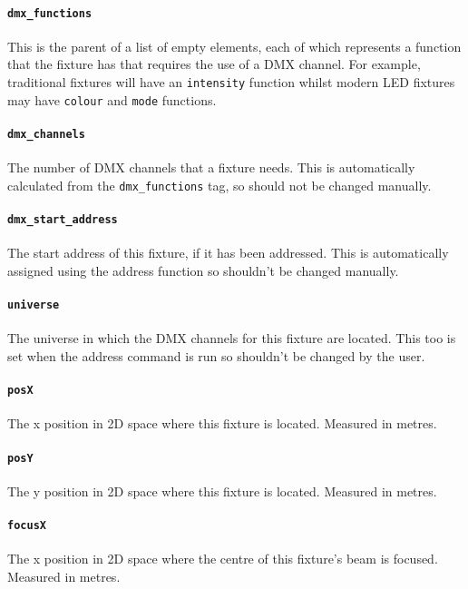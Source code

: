 \documentclass[a4paper]{article}
\begin{document}
\paragraph{\texttt{dmx\_functions}}
This is the parent of a list of empty elements, each of which represents a 
function that the fixture has that requires the use of a DMX channel. For 
example, traditional fixtures will have an \texttt{intensity} function 
whilst modern LED fixtures may have \texttt{colour} and \texttt{mode} 
functions.

\paragraph{\texttt{dmx\_channels}}
The number of DMX channels that a fixture needs. This is automatically 
calculated from the \texttt{dmx\_functions} tag, so should not be changed 
manually.

\paragraph{\texttt{dmx\_start\_address}}
The start address of this fixture, if it has been addressed. This is 
automatically assigned using the address function so shouldn't be changed 
manually.

\paragraph{\texttt{universe}}
The universe in which the DMX channels for this fixture are located. This too 
is set when the address command is run so shouldn't be changed by the user. 

\paragraph{\texttt{posX}}
The x position in 2D space where this fixture is located. Measured in metres.

\paragraph{\texttt{posY}}
The y position in 2D space where this fixture is located. Measured in metres.

\paragraph{\texttt{focusX}}
The x position in 2D space where the centre of this fixture's beam is 
focused. Measured in metres.
\end{document}
